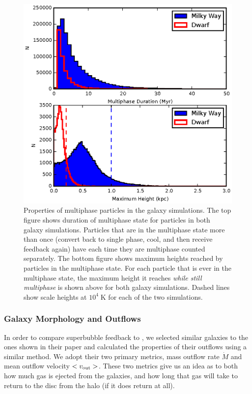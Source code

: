 \begin{figure}
    \includegraphics[width=\textwidth]{figures1/multiphase_properties.eps}
    \caption[Properties of multiphase particles]{Properties of multiphase
    particles in the galaxy simulations.  The top figure shows duration of
    multiphase state for particles in both galaxy simulations.  Particles that
    are in the multiphase state more than once (convert back to single phase,
    cool, and then receive feedback again) have each time they are multiphase
    counted separately. The bottom figure shows maximum heights reached by
    particles in the multiphase state.  For each particle that is ever in the
    multiphase state, the maximum height it reaches {\it while still multiphase}
    is shown above for both galaxy simulations.  Dashed lines show scale heights
    at $10^4\;\mathrm{K}$ for each of the two simulations.}
    \label{multiphase_properties}
\end{figure}

\subsubsection{Galaxy Morphology and Outflows}\label{Morphology}

In order to compare superbubble feedback to \citet{DallaVecchia2012}, we selected
similar galaxies to the ones shown in their paper and calculated the properties
of their outflows using a similar method.  We adopt their two primary metrics,
mass outflow rate $\dot M$ and mean outflow velocity $<v_{\rm out}>$.  These two
metrics give us an idea as to both how much gas is ejected from the galaxies,
and how long that gas will take to return to the disc from the halo (if it does
return at all).

